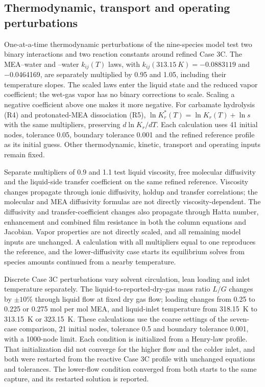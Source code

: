 \subsection{Thermodynamic, transport and operating perturbations}
One-at-a-time thermodynamic perturbations of the nine-species model test two binary interactions and two reaction constants around refined Case 3C.
The MEA--water and \COtwo--water $k_{ij}(T)$ laws, with $k_{ij}(\qty{313.15}{K})=\num{-0.0883119}$ and \num{-0.0464169}, are separately multiplied by 0.95 and 1.05, including their temperature slopes.
The scaled laws enter the liquid state and the reduced vapor \COtwo{} coefficient; the wet-gas vapor has no binary corrections to scale.
Scaling a negative coefficient above one makes it more negative.
For carbamate hydrolysis (R4) and protonated-MEA dissociation (R5), $\ln K_r^*(T)=\ln K_r(T)+\ln s$ with the same multipliers, preserving $d\ln K_r/dT$.
Each calculation uses 41 initial nodes, tolerance 0.05, boundary tolerance 0.001 and the refined reference profile as its initial guess.
Other thermodynamic, kinetic, transport and operating inputs remain fixed.

Separate multipliers of 0.9 and 1.1 test liquid viscosity, free molecular \COtwo{} diffusivity and the liquid-side \COtwo{} transfer coefficient on the same refined reference.
Viscosity changes propagate through ionic diffusivity, holdup and transfer correlations; the molecular \COtwo{} and MEA diffusivity formulas are not directly viscosity-dependent.
The diffusivity and transfer-coefficient changes also propagate through Hatta number, enhancement and combined film resistance in both the column equations and Jacobian.
Vapor properties are not directly scaled, and all remaining model inputs are unchanged.
A calculation with all multipliers equal to one reproduces the reference, and the lower-diffusivity case starts its equilibrium solves from species amounts continued from a nearby temperature.

Discrete Case 3C perturbations vary solvent circulation, lean loading and inlet temperature separately.
The liquid-to-reported-dry-gas mass ratio $L/G$ changes by $\pm10\%$ through liquid flow at fixed dry gas flow; loading changes from 0.25 to 0.225 or 0.275 mol \COtwo{} per mol MEA, and liquid-inlet temperature from \qty{318.15}{K} to \qty{313.15}{K} or \qty{323.15}{K}.
These calculations use the coarse settings of the seven-case comparison, 21 initial nodes, tolerance 0.5 and boundary tolerance 0.001, with a 1000-node limit.
Each condition is initialized from a Henry-law profile.
That initialization did not converge for the higher flow and the colder inlet, and both were restarted from the reactive Case 3C profile with unchanged equations and tolerances.
The lower-flow condition converged from both starts to the same capture, and its restarted solution is reported.

